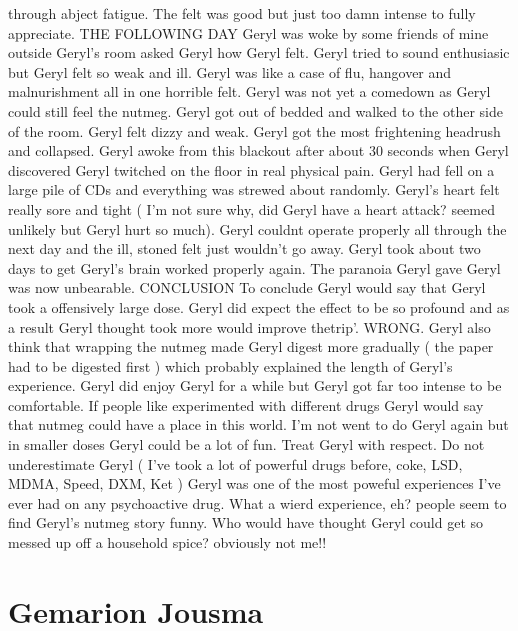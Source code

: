 \documentclass[12pt]{book}
\begin{document}
through abject fatigue. The felt was good but just too damn intense to fully appreciate. THE FOLLOWING DAY Geryl was woke by some friends of mine outside Geryl's room asked Geryl how Geryl felt. Geryl tried to sound enthusiasic but Geryl felt so weak and ill. Geryl was like a case of flu, hangover and malnurishment all in one horrible felt. Geryl was not yet a comedown as Geryl could still feel the nutmeg. Geryl got out of bedded and walked to the other side of the room. Geryl felt dizzy and weak. Geryl got the most frightening headrush and collapsed. Geryl awoke from this blackout after about 30 seconds when Geryl discovered Geryl twitched on the floor in real physical pain. Geryl had fell on a large pile of CDs and everything was strewed about randomly. Geryl's heart felt really sore and tight ( I'm not sure why, did Geryl have a heart attack? seemed unlikely but Geryl hurt so much). Geryl couldnt operate properly all through the next day and the ill, stoned felt just wouldn't go away. Geryl took about two days to get Geryl's brain worked properly again. The paranoia Geryl gave Geryl was now unbearable. CONCLUSION To conclude Geryl would say that Geryl took a offensively large dose. Geryl did expect the effect to be so profound and as a result Geryl thought took more would improve thetrip'. WRONG. Geryl also think that wrapping the nutmeg made Geryl digest more gradually ( the paper had to be digested first ) which probably explained the length of Geryl's experience. Geryl did enjoy Geryl for a while but Geryl got far too intense to be comfortable. If people like experimented with different drugs Geryl would say that nutmeg could have a place in this world. I'm not went to do Geryl again but in smaller doses Geryl could be a lot of fun. Treat Geryl with respect. Do not underestimate Geryl ( I've took a lot of powerful drugs before, coke, LSD, MDMA, Speed, DXM, Ket ) Geryl was one of the most poweful experiences I've ever had on any psychoactive drug. What a wierd experience, eh? people seem to find Geryl's nutmeg story funny. Who would have thought Geryl could get so messed up off a household spice? obviously not me!!



\chapter{Gemarion Jousma}
\end{document}
